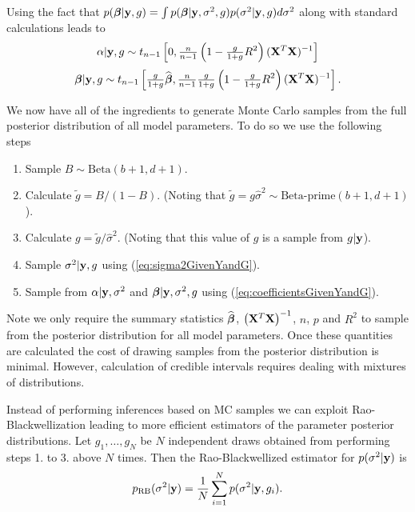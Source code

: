 \documentclass{article}[12pt]
\begin{document}
Using the fact that $p({\boldsymbol \beta}|{\bf y},g) = \int p({\boldsymbol \beta}|{\bf y},\sigma^2,g)p(\sigma^2|{\bf y},g) d \sigma^2$ 
along with standard calculations leads to
$$
\alpha|{\bf y},g \sim t_{n-1}\left[ 0, \tfrac{n}{n-1}  \left( 1 - \tfrac{g}{1+g} R^2\right) ({\bf X}^T{\bf X})^{-1} \right]
$$
\begin{equation}\label{eq:betaGivenYandU}
\displaystyle {\boldsymbol\beta}|{\bf y},g \sim t_{n-1}\left[
\tfrac{g}{1+g} \widehat{{\boldsymbol \beta}},
 \tfrac{n}{n-1}  \tfrac{g}{1+g} \left( 1 - \tfrac{g}{1+g} R^2\right) ({\bf X}^T{\bf X})^{-1}
\right].
\end{equation}

We now have all of the ingredients to generate Monte Carlo samples from the full posterior distribution of all model parameters. 
To do so we use the following steps 
\begin{enumerate}
	\item Sample $B \sim \mbox{Beta}(b+1,d+1)$.
	
	\item Calculate $\widetilde{g} = B/(1 - B)$. (Noting that $\widetilde{g} = g \widehat{\sigma}^2 \sim \mbox{Beta-prime}(b+1,d+1)$).
	
	\item Calculate $g = \widetilde{g}/\widehat{\sigma}^2$. (Noting that this value of $g$ is a sample from $g|{\bf y}$).
	
	\item Sample $\sigma^2|{\bf y},g$ using  (\ref{eq:sigma2GivenYandG}).
	
	\item Sample from $\alpha|{\bf y},\sigma^2$ and 
	${\boldsymbol \beta}|{\bf y},\sigma^2,g$ using (\ref{eq:coefficientsGivenYandG}).
	
\end{enumerate}

Note we only require the summary 
statistics $\widehat{{\boldsymbol \beta}}$, $\left( {\bf X}^T{\bf X} \right)^{-1}$, $n$, $p$ and $R^2$
to sample from the posterior distribution for all model parameters. Once these quantities are calculated the cost of drawing samples
from the posterior distribution is minimal. However, calculation
of credible intervals requires dealing with mixtures of distributions.

Instead of performing inferences based on MC samples
we can exploit Rao-Blackwellization leading to more
efficient estimators of the parameter posterior distributions. Let $g_1,\ldots,g_N$ be $N$ independent draws 
obtained from performing steps 1. to 3. above $N$ times. Then
the Rao-Blackwellized estimator for $p(\sigma^2|{\bf y})$ is
$$
\displaystyle 
p_{\mbox{\scriptsize RB}}(\sigma^2|{\bf y})
= \frac{1}{N} \sum_{i=1}^{N} p(\sigma^2|{\bf y},g_i).
$$
\end{document}
